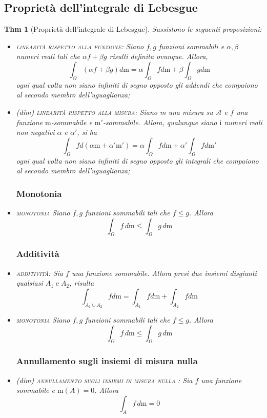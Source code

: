 \documentclass[a4paper,11pt]{article}
\theoremstyle{plain}
\newtheorem{thm}{Thm}[section]
\theoremstyle{definition}
\theoremstyle{remark}
\begin{document}
\subsection{Proprietà dell'integrale di Lebesgue}
\begin{thm} [Proprietà dell'integrale di Lebesgue] Sussistono le seguenti proposizioni:\\
\begin{itemize}
\subsubsection{Bilinearità}
\item \textsc{linearità rispetto alla funzione}: Siano $f, g$ funzioni sommabili e $ \alpha, \beta$ numeri reali tali che $\alpha f+\beta g$ risulti definita ovunque. Allora,
$$
\int_{\Omega}(\alpha f+\beta g)d\mathrm{m}=\alpha\int_{\Omega}fd\mathrm{m}+\beta\int_{\Omega}gd\mathrm{m}
$$
ogni qual volta non siano infiniti di segno opposto gli addendi che compaiono al secondo membro dell'uguaglianza;

\item (dim) \textsc{linearità rispetto alla misura}: Siano m una misura su $\mathcal{A}$ e $f$ una funzione $\mathrm{m}$-sommabile e $\mathrm{m'}$-sommabile. Allora, qualunque siano $\mathrm{i}$ numeri reali non negativi $\alpha$ e $\alpha'$, si ha
$$
\int_{\Omega}fd(\alpha \mathrm{m}+\alpha'\mathrm{m}')=\alpha\int_{\Omega}fd\mathrm{m}+\alpha'\int_{\Omega}fd\mathrm{m}'
$$
ogni qual volta non siano infiniti di segno opposto gli integrali che compaiono al secondo membro dell'uguaglianza;

\subsubsection{Monotonia}
\item [$\bullet$] \textsc{monotonia} Siano $f, g$ funzioni sommabili tali che $f\leq g$. Allora
$$
\int_{\Omega}f\, d\mathrm{m}\leq\int_{\Omega}g \, d\mathrm{m}
$$
\subsubsection{Additività}
\item  \textsc{additività}: Sia $f$ una funzione sommabile. Allora presi due  insiemi disgiunti qualsiasi $A_{1}\mathrm{\;e\;}A_{2}$, risulta
$$
\int_{A_{1}\cup A_{2}}fd\mathrm{m}=\int_{A_{1}}fd\mathrm{m}+\int_{A_{2}}fd\mathrm{m}
$$


\item \textsc{monotonia} Siano $f, g$ funzioni sommabili tali che $f\leq g$. Allora
$$
\int_{\Omega}f \, d\mathrm{m}\leq\int_{\Omega}g \, d\mathrm{m}
$$
\subsubsection{Annullamento sugli insiemi di misura nulla}
\item [$\star$ ](dim) \textsc{annullamento sugli insiemi di misura nulla} : Sia $f$ una funzione sommabile e $\mathrm{m}(A)=0$. Allora
$$
\int_{A}f \, d\mathrm{m}=0
$$
\end{itemize}
\end{thm}
\end{document}
